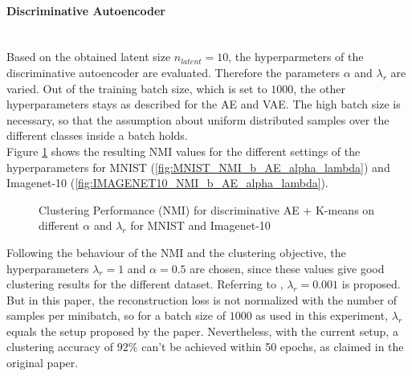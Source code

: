 \documentclass[12pt,DIV14,BCOR12mm,a4paper,footexclude,headinclude,halfparskip-,twoside,openright,cleardoubleempty,idxtotoc,bibtotoc,listtotoc,abstracton]{scrreprt} %
\numberwithin{equation}{chapter}
\begin{document}
	\paragraph{Discriminative Autoencoder}\hfill \\
	Based on the obtained latent size $n_{latent} = 10$, the hyperparmeters of the discriminative autoencoder are evaluated. Therefore the parameters $\alpha$ and $\lambda_r$ are varied. Out of the training batch size, which is set to $1000$, the other hyperparameters stays as described for the AE and VAE. The high batch size is necessary, so that the assumption about uniform distributed samples over the different classes inside a batch holds.
	\\Figure \ref{fig:ClusterPerformance_b_AE_Hyperparameters} shows the resulting NMI values for the different settings of the hyperparameters for MNIST (\ref{fig:MNIST_NMI_b_AE_alpha_lambda}) and Imagenet-10 (\ref{fig:IMAGENET10_NMI_b_AE_alpha_lambda}).
	\begin{figure}[htb!]
		\centering
		\qquad
		\caption{Clustering Performance (NMI) for discriminative AE + K-means on different $\alpha$ and $\lambda_r$ for MNIST and Imagenet-10}
		\label{fig:ClusterPerformance_b_AE_Hyperparameters}
	\end{figure}
	Following the behaviour of the NMI and the clustering objective, the hyperparameters $\lambda_r = 1$ and $\alpha=0.5$ are chosen, since these values give good clustering results for the different dataset. Referring to \cite{DiscriminativeClustering}, $\lambda_r = 0.001$ is proposed. But in this paper, the reconstruction loss is not normalized with the number of samples per minibatch, so for a batch size of $1000$ as used in this experiment, $\lambda_r$ equals the setup proposed by the paper. Nevertheless, with the current setup, a clustering accuracy of $92\%$ can't be achieved within 50 epochs, as claimed in the original paper.
\end{document}
